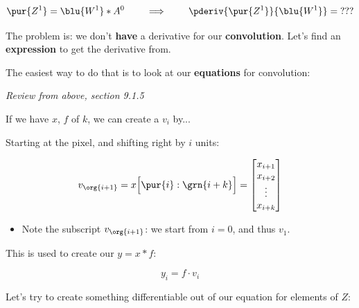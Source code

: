         \begin{equation}
            \pur{Z^1} = \blu{W^1} \ast A^0
            \qquad 
            \implies
            \qquad
            \pderiv{\pur{Z^1}}{\blu{W^1}} = \text{???}
        \end{equation}

        The problem is: we don't \textbf{have} a derivative for our \textbf{convolution}. Let's find an \textbf{expression} to get the derivative from.

        The easiest way to do that is to look at our \textbf{equations} for convolution:\\

        \begin{kequation}
            \textit{Review from above, section 9.1.5}
            
            If we have  $x$,  $f$ of  $k$, we can create a  $v_i$ by... 
            
            Starting at the  pixel, and shifting right by $i$ units:

            \begin{equation*}
                v_{\org{i+1}} = x \Big[ \pur{i}:\grn{i+k} \Big] =  
                \begin{bmatrix}
                    x_{i+1} \\ x_{i+2} \\ \vdots \\ x_{i+k}
                \end{bmatrix}
            \end{equation*}
            
            \begin{itemize}
                \item Note the subscript $v_{\org{i+1}}$: we start from $i=0$, and thus $v_1$.
            \end{itemize}

            This is used to create our  $y=x \ast f$:

            \begin{equation*}
                y_i = f \cdot v_i
            \end{equation*}
            
        \end{kequation}

        Let's try to create something differentiable out of our equation for elements of $Z$:

